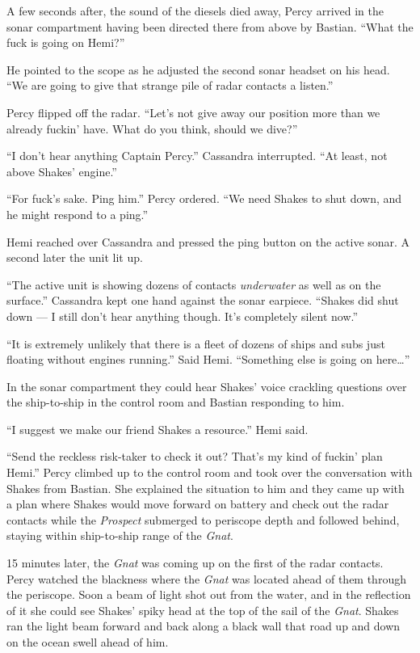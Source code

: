 \documentclass[
]{scrbook}
\begin{document}
A few seconds after, the sound of the diesels died away, Percy arrived
in the sonar compartment having been directed there from above by
Bastian. ``What the fuck is going on Hemi?''

He pointed to the scope as he adjusted the second sonar headset on his
head. ``We are going to give that strange pile of radar contacts a
listen.''

Percy flipped off the radar. ``Let's not give away our position more
than we already fuckin' have. What do you think, should we dive?''

``I don't hear anything Captain Percy.'' Cassandra interrupted. ``At
least, not above Shakes' engine.''

``For fuck's sake. Ping him.'' Percy ordered. ``We need Shakes to shut
down, and he might respond to a ping.''

Hemi reached over Cassandra and pressed the ping button on the active
sonar. A second later the unit lit up.

``The active unit is showing dozens of contacts \emph{underwater} as
well as on the surface.'' Cassandra kept one hand against the sonar
earpiece. ``Shakes did shut down --- I still don't hear anything though.
It's completely silent now.''

``It is extremely unlikely that there is a fleet of dozens of ships and
subs just floating without engines running.'' Said Hemi. ``Something
else is going on here\ldots{}''

In the sonar compartment they could hear Shakes' voice crackling
questions over the ship-to-ship in the control room and Bastian
responding to him.

``I suggest we make our friend Shakes a resource.'' Hemi said.

``Send the reckless risk-taker to check it out? That's my kind of
fuckin' plan Hemi.'' Percy climbed up to the control room and took over
the conversation with Shakes from Bastian. She explained the situation
to him and they came up with a plan where Shakes would move forward on
battery and check out the radar contacts while the \emph{Prospect}
submerged to periscope depth and followed behind, staying within
ship-to-ship range of the \emph{Gnat}.

15 minutes later, the \emph{Gnat} was coming up on the first of the
radar contacts. Percy watched the blackness where the \emph{Gnat} was
located ahead of them through the periscope. Soon a beam of light shot
out from the water, and in the reflection of it she could see Shakes'
spiky head at the top of the sail of the \emph{Gnat}. Shakes ran the
light beam forward and back along a black wall that road up and down on
the ocean swell ahead of him.
\end{document}
